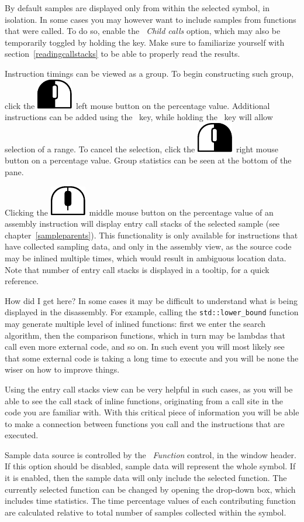 \documentclass[hidelinks,titlepage,a4paper]{article}
\newcommand{\LMB}{\includegraphics[height=.8\baselineskip]{icons/lmb}}
\newcommand{\RMB}{\includegraphics[height=.8\baselineskip]{icons/rmb}}
\newcommand{\MMB}{\includegraphics[height=.8\baselineskip]{icons/mmb}}
\begin{document}
By default samples are displayed only from within the selected symbol, in isolation. In some cases you may however want to include samples from functions that were called. To do so, enable the \emph{\faSignOut*{}~Child calls} option, which may also be temporarily toggled by holding the  key. Make sure to familiarize yourself with section~\ref{readingcallstacks} to be able to properly read the results.

Instruction timings can be viewed as a group. To begin constructing such group, click the \LMB{}~left mouse button on the percentage value. Additional instructions can be added using the \keys{\ctrl}~key, while holding the \keys{\shift}~key will allow selection of a range. To cancel the selection, click the \RMB{}~right mouse button on a percentage value. Group statistics can be seen at the bottom of the pane.

Clicking the \MMB{}~middle mouse button on the percentage value of an assembly instruction will display entry call stacks of the selected sample (see chapter~\ref{sampleparents}). This functionality is only available for instructions that have collected sampling data, and only in the assembly view, as the source code may be inlined multiple times, which would result in ambiguous location data. Note that number of entry call stacks is displayed in a tooltip, for a quick reference.

\begin{bclogo}[
noborder=true,
couleur=black!5,
logo=\bclampe
]{How did I get here?}
In some cases it may be difficult to understand what is being displayed in the disassembly. For example, calling the \texttt{std::lower\_bound} function may generate multiple level of inlined functions: first we enter the search algorithm, then the comparison functions, which in turn may be lambdas that call even more external code, and so on. In such event you will most likely see that some external code is taking a long time to execute and you will be none the wiser on how to improve things.

Using the entry call stacks view can be very helpful in such cases, as you will be able to see the call stack of inline functions, originating from a call site in the code you are familiar with. With this critical piece of information you will be able to make a connection between functions you call and the instructions that are executed.
\end{bclogo}

Sample data source is controlled by the \emph{\faSitemap{}~Function} control, in the window header. If this option should be disabled, sample data will represent the whole symbol. If it is enabled, then the sample data will only include the selected function. The currently selected function can be changed by opening the drop-down box, which includes time statistics. The time percentage values of each contributing function are calculated relative to total number of samples collected within the symbol.
\end{document}
